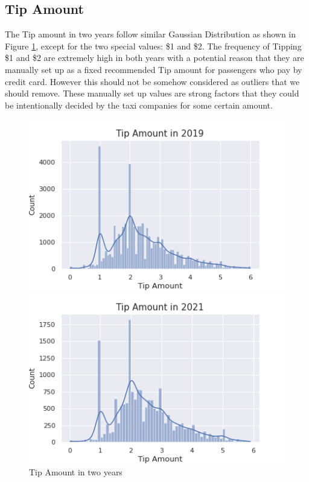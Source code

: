 \documentclass[11pt]{article}
\begin{document}
\subsection{Tip Amount}
The Tip amount in two years follow similar Gaussian Distribution as shown in Figure \ref{fig:1}, except for the two special values: \$1 and \$2. The frequency of Tipping \$1 and \$2 are extremely high in both years with a potential reason that they are manually set up as a fixed recommended Tip amount for passengers who pay by credit card. However this should not be somehow considered as outliers that we should remove. These manually set up values are strong factors that they could be intentionally decided by the taxi companies for some certain amount.
\begin{figure}[h!]
   \begin{minipage}{0.48\textwidth}
     \centering
     \includegraphics[width=0.8\linewidth]{Tip Amount in 2019.png}
   \end{minipage}\hfill
   \begin{minipage}{0.48\textwidth}
     \centering
     \includegraphics[width=0.8\linewidth]{Tip Amount in 2021.png}
   \end{minipage}
   \caption{Tip Amount in two years}
   \label{fig:1}
\end{figure}
\end{document}
